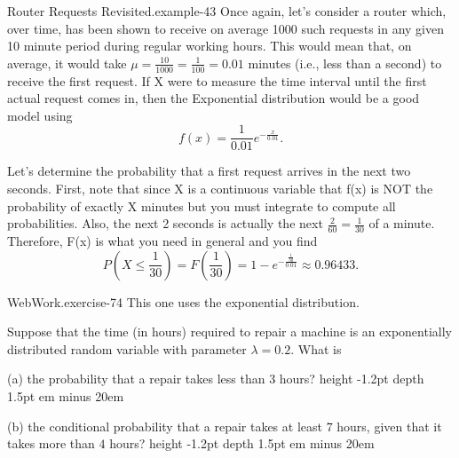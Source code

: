 \documentclass[10pt,]{book}
\newcommand{\fillin}[1]{\leavevmode\leaders\vrule height -1.2pt depth 1.5pt \hskip #1em minus #1em \null}
\numberwithin{equation}{section}
\begin{document}
\hypertarget{p-1094}{}%
\begin{example}{Router Requests Revisited.}{example-43}%
\hypertarget{p-1095}{}%
Once again, let's consider a router which, over time, has been shown to receive on average 1000 such requests in any given 10 minute period during regular working hours. This would mean that, on average, it would take \(\mu = \frac{10}{1000} = \frac{1}{100} = 0.01\) minutes (i.e., less than a second) to receive the first request. If X were to measure the time interval until the first actual request comes in, then the Exponential distribution would be a good model using%
\begin{equation*}
f(x) = \frac{1}{0.01} e^{-\frac{x}{0.01}}.
\end{equation*}
%
\par
\hypertarget{p-1096}{}%
Let's determine the probability that a first request arrives in the next two seconds. First, note that since X is a continuous variable that f(x) is NOT the probability of exactly X minutes but you must integrate to compute all probabilities. Also, the next 2 seconds is actually the next \(\frac{2}{60} = \frac{1}{30}\) of a minute. Therefore, F(x) is what you need in general and you find%
\begin{equation*}
P(X \le \frac{1}{30}) = F(\frac{1}{30}) = 1 - e^{-\frac{\frac{1}{30}}{0.01}} \approx 0.96433.
\end{equation*}
%
\end{example}
%
\par
\hypertarget{p-1097}{}%
\begin{inlineexercise}{WebWork.}{exercise-74}%
\hypertarget{p-1098}{}%
This one uses the exponential distribution.%
\par\medskip
\hypertarget{p-1099}{}%
Suppose that the time (in hours) required to repair a machine is an exponentially distributed random variable with parameter \(\lambda = 0.2\). What is%
\par
\hypertarget{p-1100}{}%
(a) the probability that a repair takes less than \(3\) hours?  \fillin{20}%
\par
\hypertarget{p-1101}{}%
(b) the conditional probability that a repair takes at least \(7\) hours, given that it takes more than \(4\) hours?  \fillin{20}%
\end{inlineexercise}
%
\par
\hypertarget{p-1102}{}%
\leavevmode%
\end{document}
